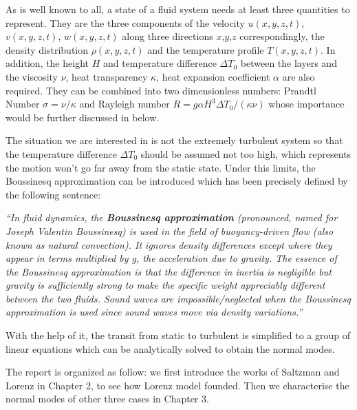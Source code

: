 As is well known to all, a state of a fluid system needs at least three quantities to represent. They are the three
components of the velocity \(u\left(x,y,z,t\right)\), \(v\left(x,y,z,t\right)\), \(w\left(x,y,z,t\right)\) along three
directions \(x\),\(y\),\(z\) correspondingly, the density distribution \(\rho\left(x,y,z,t\right)\) and the temperature
profile \(T\left(x,y,z,t\right)\). In addition, the height \(H\) and temperature difference \(\Delta T_0\) between the
layers and the viscosity \(\nu\), heat transparency \(\kappa\), heat expansion coefficient \(\alpha\) are also required. They can be combined into two dimensionless numbers: Prandtl Number \(\sigma=\nu/\kappa\) and Rayleigh number \(R=g\alpha H^3 \Delta T_0/\left(\kappa\nu\right)\) whose importance would be further discussed in below.\par
The situation we are interested in is not the extremely turbulent system so that the temperature difference \(\Delta T_0\) should be assumed not too high, which represents the motion won't go far away from the static state. Under this limits, the Boussinesq approximation can be introduced which has been precisely defined by the following sentence:
\begin{center}
	\parbox[c]{0.9\linewidth}{\textit{``In fluid dynamics, the \textbf{Boussinesq approximation} (pronounced, named for Joseph Valentin Boussinesq) is used in the field of buoyancy-driven flow (also known as natural convection). It ignores density differences except where they appear in terms multiplied by g, the acceleration due to gravity. The essence of the Boussinesq approximation is that the difference in inertia is negligible but gravity is sufficiently strong to make the specific weight appreciably different between the two fluids. Sound waves are impossible/neglected when the Boussinesq approximation is used since sound waves move via density variations.''}}
\end{center}
With the help of it, the transit from static to turbulent is simplified to a group of linear equations which can be analytically solved to obtain the normal modes.\par
The report is organized as follow: we first introduce the works of Saltzman and Lorenz in Chapter 2, to see how Lorenz model founded. Then we characterise the normal modes of other three cases in Chapter 3. \par
